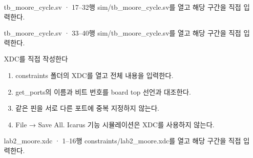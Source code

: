 \begin{frame}{tb\_moore\_cycle.sv · 17–32행}
\small
sim/tb\_moore\_cycle.sv를 열고 해당 구간을 직접 입력한다.\par\vspace{0.4cm}\par\vspace{0.4cm}
\end{frame}

\begin{frame}{tb\_moore\_cycle.sv · 33–40행}
\small
sim/tb\_moore\_cycle.sv를 열고 해당 구간을 직접 입력한다.\par\vspace{0.4cm}\par\vspace{0.4cm}
\end{frame}

\begin{frame}{XDC를 직접 작성한다}
\small
\begin{enumerate}
\item constraints 폴더의 XDC를 열고 전체 내용을 입력한다.
\item get\_ports의 이름과 비트 번호를 board top 선언과 대조한다.
\item 같은 핀을 서로 다른 포트에 중복 지정하지 않는다.
\item File → Save All. Icarus 기능 시뮬레이션은 XDC를 사용하지 않는다.
\end{enumerate}
\end{frame}

\begin{frame}{lab2\_moore.xdc · 1–16행}
\small
constraints/lab2\_moore.xdc를 열고 해당 구간을 직접 입력한다.\par\vspace{0.4cm}\par\vspace{0.4cm}
\end{frame}

